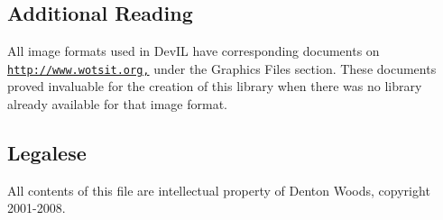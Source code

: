 \subsection*{Additional Reading }

All image formats used in Dev\+IL have corresponding documents on \href{http://www.wotsit.org,}{\tt http\+://www.\+wotsit.\+org,} under the Graphics Files section. These documents proved invaluable for the creation of this library when there was no library already available for that image format.

\subsection*{Legalese }

All contents of this file are intellectual property of Denton Woods, copyright 2001-\/2008. 